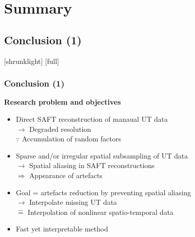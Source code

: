 \documentclass[11pt,compress,aspectratio=169]{beamer} %
\begin{document}
\section{Summary} 

\subsection{Conclusion (1)}
[shrunklight]
[full]
\begin{frame}
	\frametitle{Conclusion (1)}
	\textbf{Research problem and objectives}
	\begin{itemize}
		\item Direct SAFT reconstruction of manaual UT data\\
					$\rightarrow$ Degraded resolution \\
					$\because$ Accumulation of random factors \\
		\item Sparse and/or irregular spatial subsampling of UT data\\
					$\rightarrow$ Spatial aliasing in SAFT reconstructions\\
					$\Rightarrow$ Appearance of artefacts\\
		\item Goal = artefacts reduction by preventing spatial aliasing\\
					$\rightarrow$ Interpolate missing UT data\\
					$\hat{=}$ Interpolation of nonlinear spatio-temporal data\\
		\item Fast yet interpretable method
	\end{itemize}
\end{frame}
\end{document}
